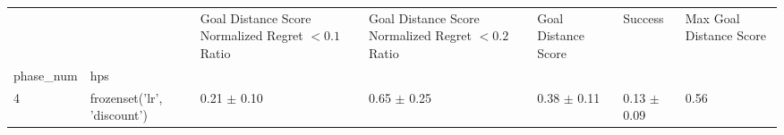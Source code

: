 \begin{tabular}{lllllll}
\toprule
 &  & Goal Distance Score Normalized Regret $< 0.1$ Ratio & Goal Distance Score Normalized Regret $< 0.2$ Ratio & Goal Distance Score & Success & Max Goal Distance Score \\
phase_num & hps &  &  &  &  &  \\
\midrule
4 & frozenset({'lr', 'discount'}) & 0.21 $\pm$ 0.10 & 0.65 $\pm$ 0.25 & 0.38 $\pm$ 0.11 & 0.13 $\pm$ 0.09 & 0.56 \\
\cline{1-7}
\bottomrule
\end{tabular}
